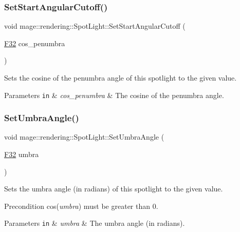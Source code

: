 \subsubsection{\texorpdfstring{Set\+Start\+Angular\+Cutoff()}{SetStartAngularCutoff()}}
{\footnotesize\ttfamily void mage\+::rendering\+::\+Spot\+Light\+::\+Set\+Start\+Angular\+Cutoff (\begin{DoxyParamCaption}\item[{\hyperlink{namespacemage_aa97e833b45f06d60a0a9c4fc22ae02c0}{F32}}]{cos\+\_\+penumbra }\end{DoxyParamCaption})\hspace{0.3cm}{\ttfamily [noexcept]}}

Sets the cosine of the penumbra angle of this spotlight to the given value.


\begin{DoxyParams}[1]{Parameters}
\mbox{\tt in}  & {\em cos\+\_\+penumbra} & The cosine of the penumbra angle. \\
\hline
\end{DoxyParams}
\hypertarget{classmage_1_1rendering_1_1_spot_light_a65c753804a53c6b9fc1c58bf036a75c1}{}\label{classmage_1_1rendering_1_1_spot_light_a65c753804a53c6b9fc1c58bf036a75c1} 
\subsubsection{\texorpdfstring{Set\+Umbra\+Angle()}{SetUmbraAngle()}}
{\footnotesize\ttfamily void mage\+::rendering\+::\+Spot\+Light\+::\+Set\+Umbra\+Angle (\begin{DoxyParamCaption}\item[{\hyperlink{namespacemage_aa97e833b45f06d60a0a9c4fc22ae02c0}{F32}}]{umbra }\end{DoxyParamCaption})\hspace{0.3cm}{\ttfamily [noexcept]}}

Sets the umbra angle (in radians) of this spotlight to the given value.

\begin{DoxyPrecond}{Precondition}
cos({\itshape umbra}) must be greater than 0. 
\end{DoxyPrecond}

\begin{DoxyParams}[1]{Parameters}
\mbox{\tt in}  & {\em umbra} & The umbra angle (in radians). \\
\hline
\end{DoxyParams}
\hypertarget{classmage_1_1rendering_1_1_spot_light_a4e6412e05d894a97409c23d8d088cabf}{}\label{classmage_1_1rendering_1_1_spot_light_a4e6412e05d894a97409c23d8d088cabf} 
